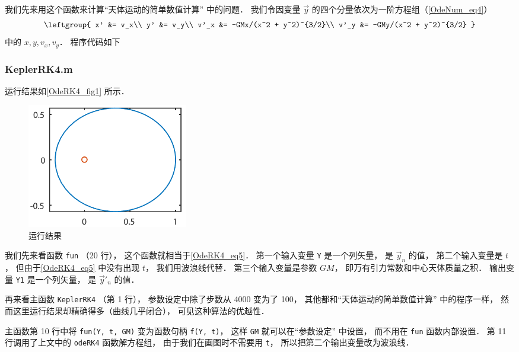 我们先来用这个函数来计算“天体运动的简单数值计算” 中的问题． 我们令因变量 $\vec y$ 的四个分量依次为一阶方程组（\autoref{OdeNum_eq4}）
\begin{equation}\label{OdeRK4_eq5}
\leftgroup{
x' &= v_x\\
y' &= v_y\\
v'_x &= -GMx/(x^2 + y^2)^{3/2}\\
v'_y &= -GMy/(x^2 + y^2)^{3/2}
}\end{equation}
中的 $x, y, v_x, v_y$． 程序代码如下

\subsubsection{KeplerRK4.m}


运行结果如\autoref{OdeRK4_fig1} 所示．

\begin{figure}[ht]
\centering
\includegraphics[width=7cm]{./figures/OdeRK4.pdf}
\caption{运行结果} \label{OdeRK4_fig1}
\end{figure}

我们先来看函数 \texttt{fun} （20 行）， 这个函数就相当于\autoref{OdeRK4_eq5}． 第一个输入变量 \texttt{Y} 是一个列矢量， 是 $\vec y_n$ 的值， 第二个输入变量是 $t$， 但由于\autoref{OdeRK4_eq5} 中没有出现 $t$， 我们用波浪线代替． 第三个输入变量是参数 $GM$， 即万有引力常数和中心天体质量之积． 输出变量 \texttt{Y1} 是一个列矢量， 是 $\vec y'_n$ 的值．

再来看主函数 \texttt{KeplerRK4} （第 1 行）， 参数设定中除了步数从 4000 变为了 100， 其他都和“天体运动的简单数值计算” 中的程序一样， 然而这里运行结果却精确得多（曲线几乎闭合）， 可见这种算法的优越性．

主函数第 10 行中将 \texttt{fun(Y, t, GM)} 变为函数句柄 \texttt{f(Y, t)}， 这样 \texttt{GM} 就可以在“参数设定” 中设置， 而不用在 \texttt{fun} 函数内部设置． 第 11 行调用了上文中的 \texttt{odeRK4} 函数解方程组， 由于我们在画图时不需要用 \texttt{t}， 所以把第二个输出变量改为波浪线．
